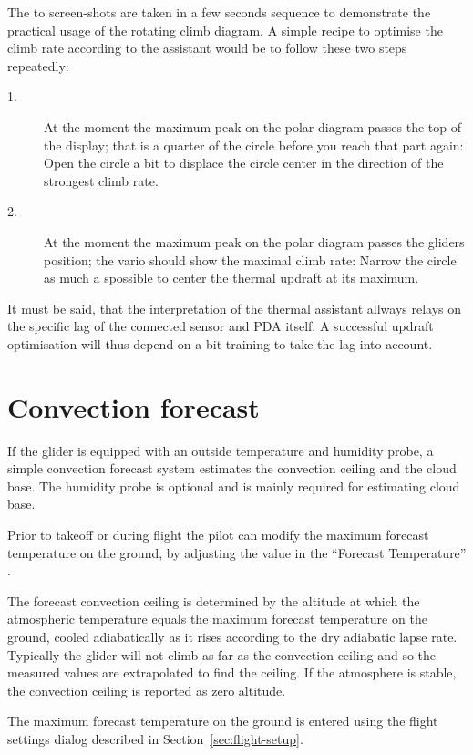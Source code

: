 The to screen-shots are taken in a few seconds sequence to demonstrate the
practical usage of the rotating climb diagram. A simple recipe to optimise
the climb rate according to the assistant would be to follow these two steps
repeatedly:
\begin{description}
\item[1.]  At the moment the maximum peak on the polar diagram passes the top of
the display; that is a quarter of the circle before you reach that part again:
Open the circle a bit to displace the circle center in the direction of the
strongest climb rate.
\item[2.]  At the moment the maximum peak on the polar diagram passes the
gliders position; the vario should show the maximal climb rate: Narrow the
circle as much a spossible to center the thermal updraft at its maximum. 
\end{description}

It must be said, that the interpretation of the thermal assistant allways relays
on the specific lag of the connected sensor and PDA itself. A successful
updraft optimisation will thus depend on a bit training to take the lag into account.


\section{Convection forecast}\label{sec:convection-forecast}

If the glider is equipped with an outside temperature and humidity
probe, a simple convection forecast system estimates the convection
ceiling and the cloud base.  The humidity probe is optional and is
mainly required for estimating cloud base.

Prior to takeoff or during flight the pilot can modify the maximum
forecast temperature on the ground, by adjusting the value in the
``Forecast Temperature'' {\InfoBox}.

The forecast convection ceiling is determined by the altitude at which
the atmospheric temperature equals the maximum forecast temperature on
the ground, cooled adiabatically as it rises according to the dry
adiabatic lapse rate.  Typically the glider will not climb as far as
the convection ceiling and so the measured values are extrapolated to
find the ceiling.  If the atmosphere is stable, the convection ceiling
is reported as zero altitude.

The maximum forecast temperature on the ground is entered using the
flight settings dialog described in Section~\ref{sec:flight-setup}.


